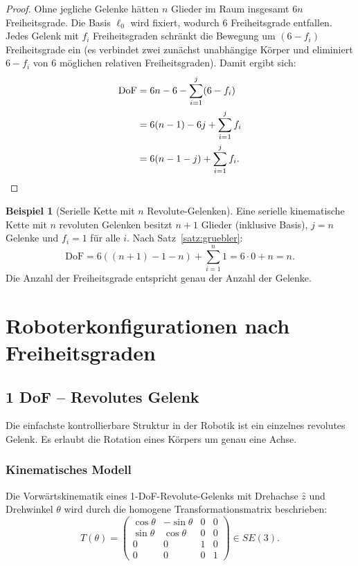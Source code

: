 ﻿\documentclass[a4paper,12pt]{article}
\theoremstyle{definition}
\newtheorem{beispiel}{Beispiel}
\begin{document}
\begin{proof}
	Ohne jegliche Gelenke hätten $n$ Glieder im Raum insgesamt $6n$ Freiheitsgrade. Die Basis $\ell_0$ wird fixiert, wodurch $6$ Freiheitsgrade entfallen. Jedes Gelenk mit $f_i$ Freiheitsgraden schränkt die Bewegung um $(6 - f_i)$ Freiheitsgrade ein (es verbindet zwei zunächst unabhängige Körper und eliminiert $6 - f_i$ von 6 möglichen relativen Freiheitsgraden). Damit ergibt sich:
	\begin{align*}
		\text{DoF} &= 6n - 6 - \sum_{i=1}^{j}(6 - f_i) \\
		           &= 6(n-1) - 6j + \sum_{i=1}^{j} f_i \\
		           &= 6(n-1-j) + \sum_{i=1}^{j} f_i. \qedhere
	\end{align*}
\end{proof}

\begin{beispiel}[Serielle Kette mit $n$ Revolute-Gelenken]
	Eine serielle kinematische Kette mit $n$ revoluten Gelenken besitzt $n+1$ Glieder (inklusive Basis), $j = n$ Gelenke und $f_i = 1$ für alle $i$. Nach Satz~\ref{satz:gruebler}:
	\[
		\text{DoF} = 6((n+1) - 1 - n) + \sum_{i=1}^{n} 1 = 6 \cdot 0 + n = n.
	\]
	Die Anzahl der Freiheitsgrade entspricht genau der Anzahl der Gelenke.
\end{beispiel}

\section{Roboterkonfigurationen nach Freiheitsgraden}

\subsection{1 DoF -- Revolutes Gelenk}

Die einfachste kontrollierbare Struktur in der Robotik ist ein einzelnes revolutes Gelenk. Es erlaubt die Rotation eines Körpers um genau eine Achse.

\subsubsection{Kinematisches Modell}

Die Vorwärtskinematik eines 1-DoF-Revolute-Gelenks mit Drehachse $\hat{z}$ und Drehwinkel $\theta$ wird durch die homogene Transformationsmatrix beschrieben:
\[
T(\theta) = \begin{pmatrix}
	\cos\theta & -\sin\theta & 0 & 0 \\
	\sin\theta &  \cos\theta & 0 & 0 \\
	0          &  0          & 1 & 0 \\
	0          &  0          & 0 & 1
\end{pmatrix} \in SE(3).
\]
\end{document}
